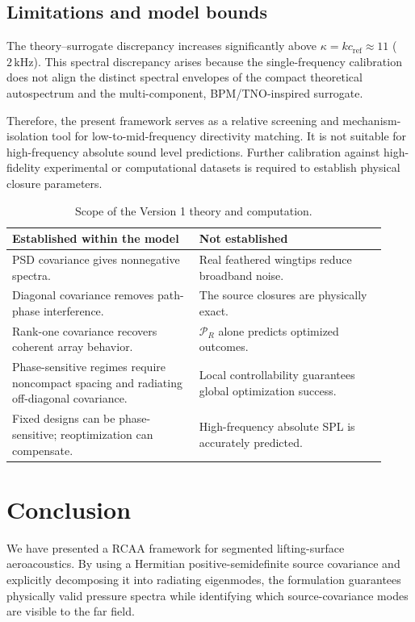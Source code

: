 \documentclass[11pt]{article}
\begin{document}
\subsection{Limitations and model bounds}

The theory--surrogate discrepancy increases significantly above $\kappa = kc_{\mathrm{ref}} \approx 11$ ($2\,\mathrm{kHz}$). This spectral discrepancy arises because the single-frequency calibration does not align the distinct spectral envelopes of the compact theoretical autospectrum and the multi-component, BPM/TNO-inspired surrogate.

Therefore, the present framework serves as a relative screening and mechanism-isolation tool for low-to-mid-frequency directivity matching. It is not suitable for high-frequency absolute sound level predictions. Further calibration against high-fidelity experimental or computational datasets is required to establish physical closure parameters.

\begin{table}[htbp]
\centering
\caption{Scope of the Version 1 theory and computation.}
\label{tab:scope_bounds}
\begin{tabular}{p{0.46\linewidth}p{0.46\linewidth}}
\toprule
\textbf{Established within the model} & \textbf{Not established} \\
\midrule
PSD covariance gives nonnegative spectra. & Real feathered wingtips reduce broadband noise. \\
Diagonal covariance removes path-phase interference. & The source closures are physically exact. \\
Rank-one covariance recovers coherent array behavior. & $\mathcal P_R$ alone predicts optimized outcomes. \\
Phase-sensitive regimes require noncompact spacing and radiating off-diagonal covariance. & Local controllability guarantees global optimization success. \\
Fixed designs can be phase-sensitive; reoptimization can compensate. & High-frequency absolute SPL is accurately predicted. \\
\bottomrule
\end{tabular}
\end{table}

\section{Conclusion}

We have presented a RCAA framework for segmented lifting-surface aeroacoustics. By using a Hermitian positive-semidefinite source covariance and explicitly decomposing it into radiating eigenmodes, the formulation guarantees physically valid pressure spectra while identifying which source-covariance modes are visible to the far field.
\end{document}
